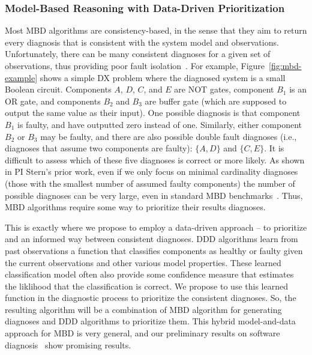 \documentclass[12pt]{article}
\begin{document}
\subsubsection{Model-Based Reasoning with Data-Driven Prioritization} 
Most MBD algorithms are consistency-based, in the sense that they aim to return every diagnosis  that is consistent with the system model and observations. 
Unfortunately, there can be many consistent diagnoses for a given set of observations, thus providing poor fault isolation~\cite{stern2015many}. 
For example, Figure~\ref{fig:mbd-example} shows a simple DX problem where the diagnosed system is a small Boolean circuit. Components $A$, $D$, $C$, and $E$ are NOT gates, component $B_1$ is an OR gate, and components $B_2$ and $B_3$ are buffer gate (which are supposed to output the same value as their input). One possible diagnosis is that component $B_1$ is faulty, and have outputted zero instead of one. Similarly, either component $B_2$ or $B_3$ may be faulty, 
and there are also possible double fault diagnoses (i.e., diagnoses that assume two components are faulty): $\{ A,D \}$ and $\{C,E\}$. It is difficult to assess which of these five diagnoses is correct or more likely. 
As shown in PI Stern's prior work, even if we only focus on minimal cardinality diagnoses (those with the smallest number of assumed faulty components) the number of possible diagnoses can be very large, even in standard MBD benchmarks~\cite{stern2015many}. Thus, MBD algorithms require some way to prioritize their results diagnoses. 


This is exactly where we propose to employ a data-driven approach -- to prioritize and an informed way between consistent diagnoses. 
DDD algorithms learn from past observations a function that classifies components as healthy or faulty given the current observations and other various model properties. These learned classification model often also provide some confidence measure that estimates the liklihood that the classification is correct. We propose to use this learned function in the diagnostic process to prioritize the consistent diagnoses. So, the resulting algorithm will be a combination of MBD algorithm for generating diagnoses and DDD algorithms to prioritize them. This hybrid model-and-data approach for MBD is very general, and our preliminary results on software diagnosis~\cite{elmishali2016data} show promising results. 
\end{document}
